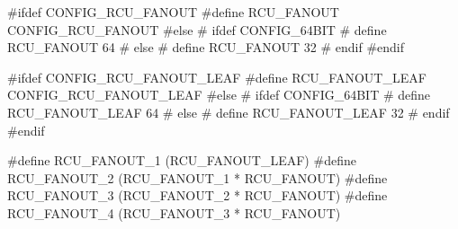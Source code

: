\begin{fcvlabel}
\begin{VerbatimN}[breaklines=true,xleftmargin=1pt,xrightmargin=0pt,commandchars=\%\@\$]
	#ifdef CONFIG_RCU_FANOUT
	#define RCU_FANOUT CONFIG_RCU_FANOUT
	#else
	# ifdef CONFIG_64BIT
	# define RCU_FANOUT 64
	# else
	# define RCU_FANOUT 32
	# endif
	#endif

	#ifdef CONFIG_RCU_FANOUT_LEAF     %
	#define RCU_FANOUT_LEAF CONFIG_RCU_FANOUT_LEAF
	#else
	# ifdef CONFIG_64BIT
	# define RCU_FANOUT_LEAF 64
	# else
	# define RCU_FANOUT_LEAF 32
	# endif
	#endif                            %

	#define RCU_FANOUT_1        (RCU_FANOUT_LEAF) %
	#define RCU_FANOUT_2        (RCU_FANOUT_1 * RCU_FANOUT)
	#define RCU_FANOUT_3        (RCU_FANOUT_2 * RCU_FANOUT)
	#define RCU_FANOUT_4        (RCU_FANOUT_3 * RCU_FANOUT) %


\end{VerbatimN}
\end{fcvlabel}
